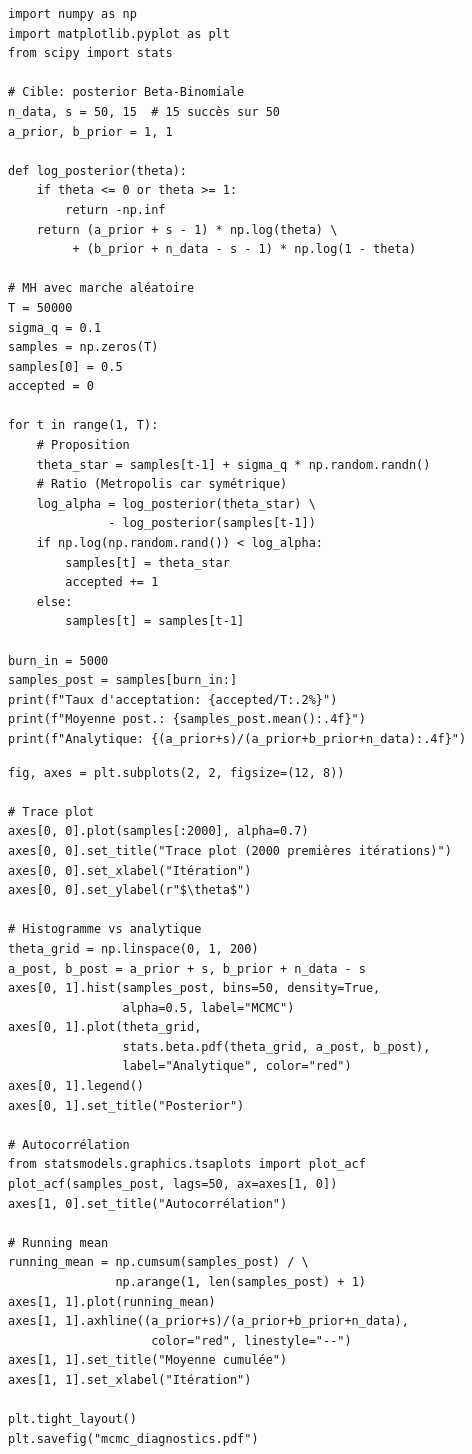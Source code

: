 \begin{codeblock}[title=\textbf{Metropolis--Hastings \`a la main}]
\begin{verbatim}
import numpy as np
import matplotlib.pyplot as plt
from scipy import stats

# Cible: posterior Beta-Binomiale
n_data, s = 50, 15  # 15 succès sur 50
a_prior, b_prior = 1, 1

def log_posterior(theta):
    if theta <= 0 or theta >= 1:
        return -np.inf
    return (a_prior + s - 1) * np.log(theta) \
         + (b_prior + n_data - s - 1) * np.log(1 - theta)

# MH avec marche aléatoire
T = 50000
sigma_q = 0.1
samples = np.zeros(T)
samples[0] = 0.5
accepted = 0

for t in range(1, T):
    # Proposition
    theta_star = samples[t-1] + sigma_q * np.random.randn()
    # Ratio (Metropolis car symétrique)
    log_alpha = log_posterior(theta_star) \
              - log_posterior(samples[t-1])
    if np.log(np.random.rand()) < log_alpha:
        samples[t] = theta_star
        accepted += 1
    else:
        samples[t] = samples[t-1]

burn_in = 5000
samples_post = samples[burn_in:]
print(f"Taux d'acceptation: {accepted/T:.2%}")
print(f"Moyenne post.: {samples_post.mean():.4f}")
print(f"Analytique: {(a_prior+s)/(a_prior+b_prior+n_data):.4f}")
\end{verbatim}
\end{codeblock}

\begin{codeblock}[title=\textbf{Diagnostics MCMC}]
\begin{verbatim}
fig, axes = plt.subplots(2, 2, figsize=(12, 8))

# Trace plot
axes[0, 0].plot(samples[:2000], alpha=0.7)
axes[0, 0].set_title("Trace plot (2000 premières itérations)")
axes[0, 0].set_xlabel("Itération")
axes[0, 0].set_ylabel(r"$\theta$")

# Histogramme vs analytique
theta_grid = np.linspace(0, 1, 200)
a_post, b_post = a_prior + s, b_prior + n_data - s
axes[0, 1].hist(samples_post, bins=50, density=True,
                alpha=0.5, label="MCMC")
axes[0, 1].plot(theta_grid,
                stats.beta.pdf(theta_grid, a_post, b_post),
                label="Analytique", color="red")
axes[0, 1].legend()
axes[0, 1].set_title("Posterior")

# Autocorrélation
from statsmodels.graphics.tsaplots import plot_acf
plot_acf(samples_post, lags=50, ax=axes[1, 0])
axes[1, 0].set_title("Autocorrélation")

# Running mean
running_mean = np.cumsum(samples_post) / \
               np.arange(1, len(samples_post) + 1)
axes[1, 1].plot(running_mean)
axes[1, 1].axhline((a_prior+s)/(a_prior+b_prior+n_data),
                    color="red", linestyle="--")
axes[1, 1].set_title("Moyenne cumulée")
axes[1, 1].set_xlabel("Itération")

plt.tight_layout()
plt.savefig("mcmc_diagnostics.pdf")
\end{verbatim}
\end{codeblock}

